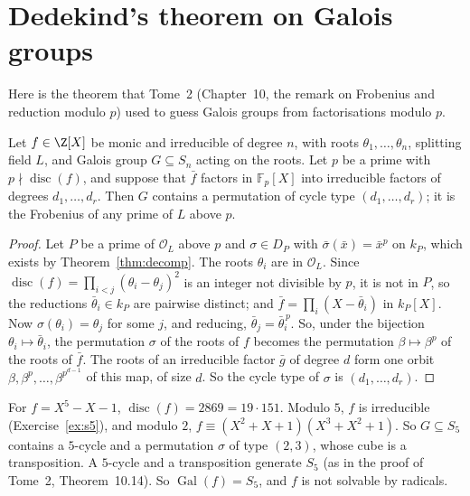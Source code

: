 \section{Dedekind's theorem on Galois groups}

Here is the theorem that Tome~2 (Chapter~10, the remark on Frobenius and reduction modulo $p$) used to guess Galois groups from factorisations modulo $p$.

\begin{theorem}[Dedekind]\label{thm:dedekindcycle}
Let $f\in\Z[X]$ be monic and irreducible of degree $n$, with roots $\theta_1,\dots,\theta_n$, splitting field $L$, and
Galois group $G\subseteq S_n$ acting on the roots. Let $p$ be a prime with $p\nmid\operatorname{disc}(f)$, and suppose that
$\bar f$ factors in $\mathbb F_p[X]$ into irreducible factors of degrees $d_1,\dots,d_r$. Then $G$ contains a permutation
of cycle type $(d_1,\dots,d_r)$; it is the Frobenius of any prime of $L$ above $p$.
\end{theorem}
\begin{proof}
Let $P$ be a prime of $\mathcal O_L$ above $p$ and $\sigma\in D_P$ with $\bar\sigma(\bar x)=\bar x^p$ on $k_P$, which
exists by Theorem~\ref{thm:decomp}. The roots $\theta_i$ are in $\mathcal O_L$. Since $\operatorname{disc}(f)=\prod_{i<j}
(\theta_i-\theta_j)^2$ is an integer not divisible by $p$, it is not in $P$, so the reductions $\bar\theta_i\in k_P$ are
pairwise distinct; and $\bar f=\prod_i(X-\bar\theta_i)$ in $k_P[X]$. Now $\sigma(\theta_i)=\theta_j$ for some $j$, and
reducing, $\bar\theta_j=\bar\theta_i^{\,p}$. So, under the bijection $\theta_i\mapsto\bar\theta_i$, the permutation
$\sigma$ of the roots of $f$ becomes the permutation $\beta\mapsto\beta^p$ of the roots of $\bar f$. The roots of an
irreducible factor $\bar g$ of degree $d$ form one orbit $\beta,\beta^p,\dots,\beta^{p^{d-1}}$ of this map, of size $d$.
So the cycle type of $\sigma$ is $(d_1,\dots,d_r)$.
\end{proof}

\begin{example}
For $f=X^5-X-1$, $\operatorname{disc}(f)=2869=19\cdot151$. Modulo $5$, $f$ is irreducible (Exercise~\ref{ex:s5}), and
modulo $2$, $f\equiv(X^2+X+1)(X^3+X^2+1)$. So $G\subseteq S_5$ contains a $5$-cycle and a permutation $\sigma$ of type
$(2,3)$, whose cube is a transposition. A $5$-cycle and a transposition generate $S_5$ (as in the proof of Tome~2,
Theorem~10.14). So $\operatorname{Gal}(f)=S_5$, and $f$ is not solvable by radicals.
\end{example}

